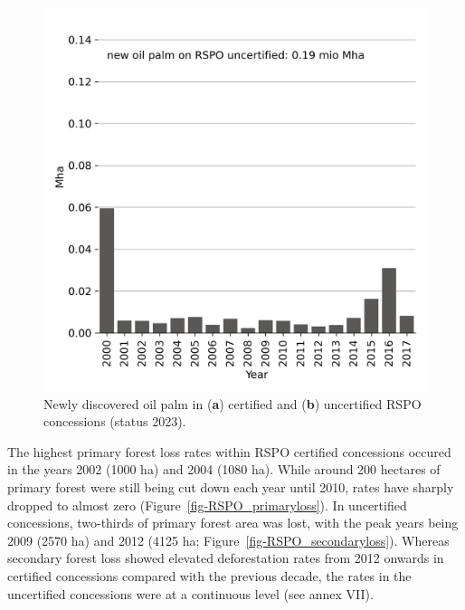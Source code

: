 \documentclass[
  letterpaper,
  DIV=11,
  numbers=noendperiod]{scrreprt}
\begin{document}
\begin{figure}
\begin{minipage}[t]{0.49\linewidth}
{{\includegraphics{text/../code/results/final_plots/oil_palm_in_RSPO_uncertified_regions.png}

}

}

\end{minipage}%

\caption{\label{fig-RSPO_newop}Newly discovered oil palm in (\textbf{a})
certified and (\textbf{b}) uncertified RSPO concessions (status 2023).}

\end{figure}

The highest primary forest loss rates within RSPO certified concessions
occured in the years 2002 (1000 ha) and 2004 (1080 ha). While around 200
hectares of primary forest were still being cut down each year until
2010, rates have sharply dropped to almost zero
(Figure~\ref{fig-RSPO_primaryloss}). In uncertified concessions,
two-thirds of primary forest area was lost, with the peak years being
2009 (2570 ha) and 2012 (4125 ha; Figure~\ref{fig-RSPO_secondaryloss}).
Whereas secondary forest loss showed elevated deforestation rates from
2012 onwards in certified concessions compared with the previous decade,
the rates in the uncertified concessions were at a continuous level (see
annex VII).
\end{document}
